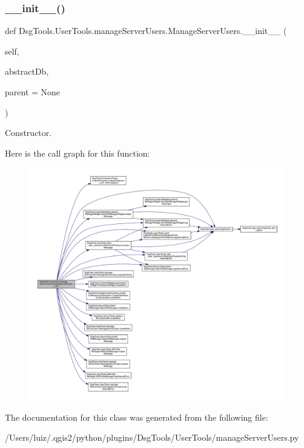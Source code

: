 \subsubsection{\texorpdfstring{\+\_\+\+\_\+init\+\_\+\+\_\+()}{\_\_init\_\_()}}
{\footnotesize\ttfamily def Dsg\+Tools.\+User\+Tools.\+manage\+Server\+Users.\+Manage\+Server\+Users.\+\_\+\+\_\+init\+\_\+\+\_\+ (\begin{DoxyParamCaption}\item[{}]{self,  }\item[{}]{abstract\+Db,  }\item[{}]{parent = {\ttfamily None} }\end{DoxyParamCaption})}

\begin{DoxyVerb}Constructor.\end{DoxyVerb}
 Here is the call graph for this function\+:
\nopagebreak
\begin{figure}[H]
\begin{center}
\leavevmode
\includegraphics[width=350pt]{class_dsg_tools_1_1_user_tools_1_1manage_server_users_1_1_manage_server_users_ace8875b04b8b92084cacb1d77f267b4c_cgraph}
\end{center}
\end{figure}


The documentation for this class was generated from the following file\+:\begin{DoxyCompactItemize}
\item 
/\+Users/luiz/.\+qgis2/python/plugins/\+Dsg\+Tools/\+User\+Tools/manage\+Server\+Users.\+py\end{DoxyCompactItemize}
